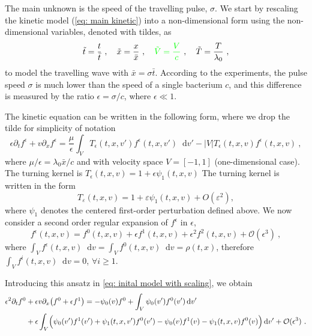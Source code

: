 \documentclass[11pt,twoside]{article}
\newcommand*\diff{\mathop{}\!\mathrm{d}}
\theoremstyle{plain}
\theoremstyle{nonumberplain}
\newcommand{\e}{\epsilon}
\begin{document}
The main unknown is the speed of the travelling pulse, $\sigma$. We start by rescaling the kinetic model (\ref{eq: main kinetic}) into a non-dimensional form using the non-dimensional variables, denoted with tildes, as
\begin{equation}
    \tilde{t}= \frac{{t}}{\bar{t}}\ , \quad \tilde{x} = \frac{x}{\bar{x}}\ , \quad {\color{green}\tilde{V} = \frac{V}{c}}\ , \quad \tilde{T}=\frac{T}{\lambda_0}\ ,
    \nonumber
\end{equation}
to model the travelling wave with $\bar{x} = \sigma\bar{t}$. According to the experiments, the pulse
speed $\sigma$ is much lower than the speed of a single bacterium $c$, and this difference is measured by the ratio $\epsilon = \sigma / c$, where $\epsilon \ll 1$.



The kinetic equation can be written in the following form, where we  drop the tilde for simplicity of notation 
{\color{red}
\begin{equation}
    \epsilon \partial_t f^\epsilon+{v}\partial_x f^\epsilon = \frac{\mu}{\epsilon}\int_V T_\epsilon(t,x,v')f^\epsilon(t,x,v')\diff v'-|V|T_\epsilon(t,x,v)f^\epsilon(t,x,v)\ , \label{eq: inital model with scaling}
\end{equation}}
where $\mu/\epsilon=\lambda_0 \bar{x}/c$ and with velocity space \( V = [-1,1] \) (one-dimensional case). {\color{green}The turning kernel is $T_\epsilon(t,x,v)=1+\epsilon \psi_1(t,x,v)$}{\color{red} The turning kernel is written in the form
\[
T_\varepsilon(t,x,v)=1+\varepsilon\psi_1(t,x,v)+O(\varepsilon^2),
\]
where \(\psi_1\) denotes the centered first-order perturbation defined above}.
We now consider a second order regular expansion of $f^\e$ in $\epsilon$, 
\begin{equation*}
f^\e(t,{x},{v})=f^0(t,{x},{v})+\epsilon f^1(t,{x},{v})+\epsilon^2 f^2(t,{x},{v})+\mathcal{O}(\epsilon^3)\ , 
\end{equation*}
where $\int_V f^\e(t,{x},{v})\diff {v} = \int_V f^0(t,{x},{v})\diff {v} = \rho(t,{x})$, therefore $\int_V f^i(t,{x},{v})\diff {v}=0$, $\forall i\geq 1$.






Introducing this ansatz in \eqref{eq: inital model with scaling}, we obtain
\iffalse
{\begin{align*}
    \epsilon^2\partial_t f^0&+\epsilon{v}\partial_x\big(f^0+\epsilon f^1  \big) 
    =-\psi_0(v) f^0+\int_V\psi_0(v')f^0(v')\diff v'\\
    &+\epsilon\int_V\Bigl(\psi_0(v')f^1(v')+\psi_1(t,x,v')f^0(v')-\psi_0(v)f^1(v)-\psi_1(t,x,v)f^0(v) \Bigr)\diff v'+{\mathcal{O}(\epsilon^3)}
      \ .
\end{align*}}
\end{document}
